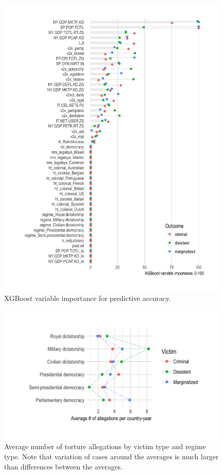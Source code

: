 \documentclass[12pt]{article}
\begin{document}
\begin{figure}
\begin{center}
\caption{XGBoost variable importance for predictive accuracy.}
\label{var-imp}
\includegraphics[width=.99\textwidth]{../output/xgboost-variable-importance.png}
\end{center}
\end{figure}

\begin{figure}
\begin{center}
\caption{Average number of torture allegations by victim type and regime type. Note that variation of cases around the averages is much larger than differences between the averages.}
\label{democracy}
\includegraphics[width=.7\textwidth]{../output/avg-allegations-by-regime.png}
\end{center}
\end{figure}
\end{document}

